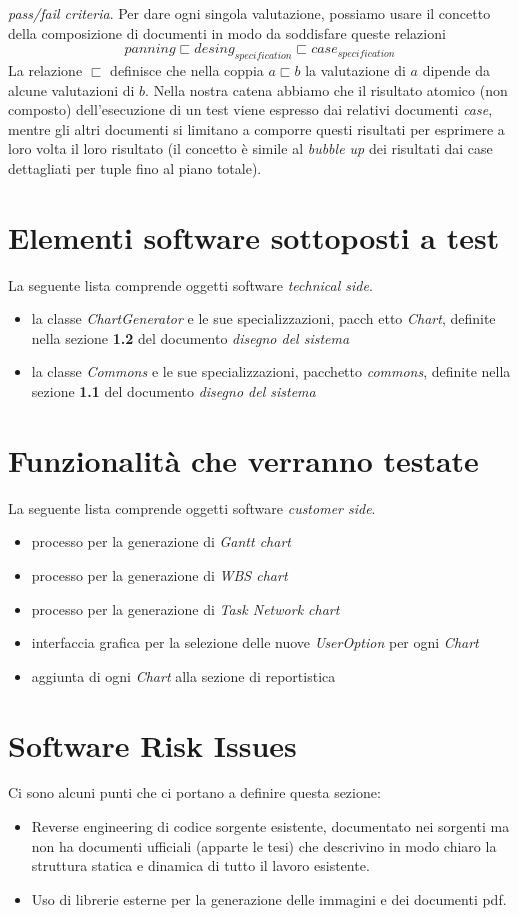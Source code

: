 \emph{pass/fail criteria}. Per dare ogni singola valutazione, possiamo usare il
concetto della composizione di documenti in modo da soddisfare queste
relazioni $$panning \sqsubset desing_{specification} \sqsubset case_{
specification}$$
La relazione $\sqsubset$ definisce che nella coppia $a \sqsubset b$ la
valutazione di $a$ dipende da alcune valutazioni di $b$. Nella nostra catena 
abbiamo che il risultato atomico (non composto) dell'esecuzione di un test 
viene espresso dai relativi documenti \emph{case}, mentre gli altri documenti 
si limitano a comporre questi risultati per esprimere a loro volta il loro 
risultato (il concetto \`e simile al \emph{bubble up} dei risultati dai case 
dettagliati per tuple fino al piano totale).

\section{Elementi software sottoposti a test}
La seguente lista comprende oggetti software \emph{technical side}.
\begin{itemize}
  \item la classe \emph{ChartGenerator} e le sue specializzazioni, pacch
 etto \emph{Chart}, definite nella sezione \textbf{1.2} del documento
 \emph{disegno del sistema}
  \item la classe \emph{Commons} e le sue specializzazioni, pacchetto 
  \emph{commons}, definite nella sezione \textbf{1.1} del documento 
  \emph{disegno del sistema}
\end{itemize}

\section{Funzionalit\`a che verranno testate}
La seguente lista comprende oggetti software \emph{customer side}.
\begin{itemize}
  \item processo per la generazione di \emph{Gantt chart}
  \item processo per la generazione di \emph{WBS chart}
  \item processo per la generazione di \emph{Task Network chart}
  \item interfaccia grafica per la selezione delle nuove \emph{UserOption} per
  ogni \emph{Chart}
  \item aggiunta di ogni \emph{Chart} alla sezione di reportistica
\end{itemize}

\section{Software Risk Issues}
Ci sono alcuni punti che ci portano a definire questa sezione:
\begin{itemize}
  \item Reverse engineering di codice sorgente esistente, documentato nei sorgenti
ma non ha documenti ufficiali (apparte le tesi) che descrivino in modo chiaro
la struttura statica e dinamica di tutto il lavoro esistente.
  \item Uso di librerie esterne per la generazione delle immagini e dei
  documenti pdf.
\end{itemize}

